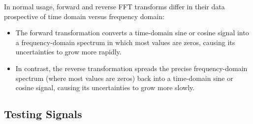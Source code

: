 \documentclass[twoside]{article}
\numberwithin{equation}{section}
\newcommand{\eqspace}{\;\;\;}
\begin{document}
In normal usage, forward and reverse FFT transforms differ in their data prospective of time domain versus frequency domain:
\begin{itemize}
\item The forward transformation converts a time-domain sine or cosine signal into a frequency-domain spectrum in which most values are zeros, causing its uncertainties to grow more rapidly. 

\item In contrast, the reverse transformation spreads the precise frequency-domain spectrum (where most values are zeros) back into a time-domain sine or cosine signal, causing its uncertainties to grow more slowly. 
\end{itemize}


\subsection{Testing Signals}

\end{document}
